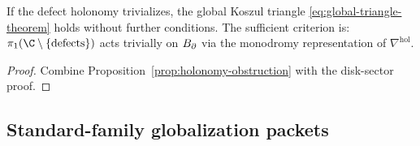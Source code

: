 \begin{corollary}
If the defect holonomy trivializes, the global Koszul triangle
\eqref{eq:global-triangle-theorem} holds without further conditions.
The sufficient criterion is: $\pi_1(\C\setminus\{\text{defects}\})$
acts trivially on $B_{\partial}$ via the monodromy representation of
$\nabla^{\mathrm{hol}}$.
\end{corollary}

\begin{proof}
Combine Proposition~\ref{prop:holonomy-obstruction} with the disk-sector
proof.
\end{proof}


\subsection{Standard-family globalization packets}


